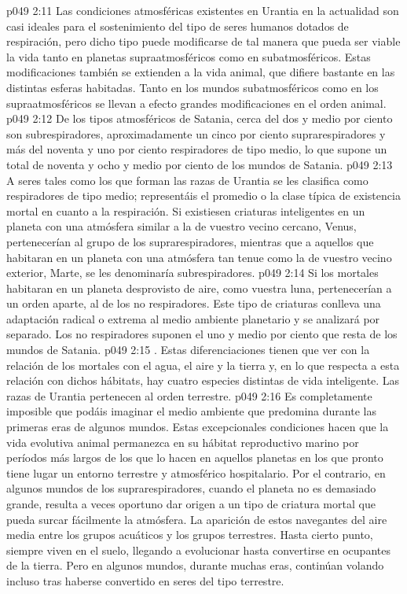 \vs p049 2:11 Las condiciones atmosféricas existentes en Urantia en la actualidad son casi ideales para el sostenimiento del tipo de seres humanos dotados de respiración, pero dicho tipo puede modificarse de tal manera que pueda ser viable la vida tanto en planetas supraatmosféricos como en subatmosféricos. Estas modificaciones también se extienden a la vida animal, que difiere bastante en las distintas esferas habitadas. Tanto en los mundos subatmosféricos como en los supraatmosféricos se llevan a efecto grandes modificaciones en el orden animal.
\vs p049 2:12 De los tipos atmosféricos de Satania, cerca del dos y medio por ciento son subrespiradores, aproximadamente un cinco por ciento suprarespiradores y más del noventa y uno por ciento respiradores de tipo medio, lo que supone un total de noventa y ocho y medio por ciento de los mundos de Satania.
\vs p049 2:13 A seres tales como los que forman las razas de Urantia se les clasifica como respiradores de tipo medio; representáis el promedio o la clase típica de existencia mortal en cuanto a la respiración. Si existiesen criaturas inteligentes en un planeta con una atmósfera similar a la de vuestro vecino cercano, Venus, pertenecerían al grupo de los suprarespiradores, mientras que a aquellos que habitaran en un planeta con una atmósfera tan tenue como la de vuestro vecino exterior, Marte, se les denominaría subrespiradores.
\vs p049 2:14 Si los mortales habitaran en un planeta desprovisto de aire, como vuestra luna, pertenecerían a un orden aparte, al de los no respiradores. Este tipo de criaturas conlleva una adaptación radical o extrema al medio ambiente planetario y se analizará por separado. Los no respiradores suponen el uno y medio por ciento que resta de los mundos de Satania.
\vs p049 2:15 . Estas diferenciaciones tienen que ver con la relación de los mortales con el agua, el aire y la tierra y, en lo que respecta a esta relación con dichos hábitats, hay cuatro especies distintas de vida inteligente. Las razas de Urantia pertenecen al orden terrestre.
\vs p049 2:16 Es completamente imposible que podáis imaginar el medio ambiente que predomina durante las primeras eras de algunos mundos. Estas excepcionales condiciones hacen que la vida evolutiva animal permanezca en su hábitat reproductivo marino por períodos más largos de los que lo hacen en aquellos planetas en los que pronto tiene lugar un entorno terrestre y atmosférico hospitalario. Por el contrario, en algunos mundos de los suprarespiradores, cuando el planeta no es demasiado grande, resulta a veces oportuno dar origen a un tipo de criatura mortal que pueda surcar fácilmente la atmósfera. La aparición de estos navegantes del aire media entre los grupos acuáticos y los grupos terrestres. Hasta cierto punto, siempre viven en el suelo, llegando a evolucionar hasta convertirse en ocupantes de la tierra. Pero en algunos mundos, durante muchas eras, continúan volando incluso tras haberse convertido en seres del tipo terrestre.
